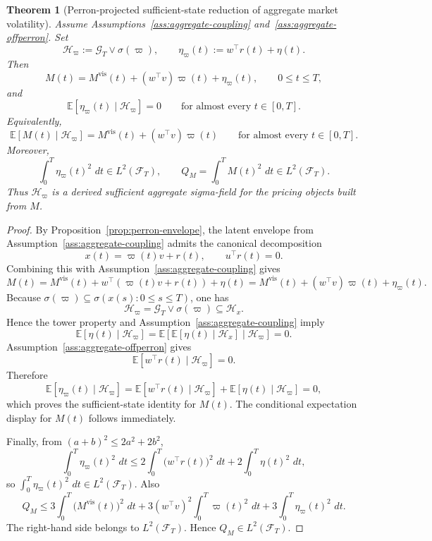 \documentclass[11pt,a4paper]{amsart}
\theoremstyle{plain}
\newtheorem{theorem}{Theorem}[section]
\theoremstyle{definition}
\theoremstyle{remark}
\newcommand{\EE}{\mathbb{E}}
\newcommand{\dd}{\,d}
\newcommand{\cH}{\mathcal{H}}
\newcommand{\cF}{\mathcal{F}}
\newcommand{\cG}{\mathcal{G}}
\begin{document}
\begin{theorem}[Perron-projected sufficient-state reduction of aggregate market volatility]\label{thm:sufficient-state-aggregate}
Assume Assumptions~\ref{ass:aggregate-coupling} and~\ref{ass:aggregate-offperron}.  Set
\[
        \cH_\varpi:=\cG_T\vee \sigma(\varpi),
        \qquad
        \eta_\varpi(t):=w^\top r(t)+\eta(t).
\]
Then
\[
        M(t)=M^{\mathrm{vis}}(t)+(w^\top v)\varpi(t)+\eta_\varpi(t),
        \qquad
        0\le t\le T,
\]
and
\[
        \EE[\eta_\varpi(t)\mid \cH_\varpi]=0
        \qquad
        \text{for almost every } t\in[0,T].
\]
Equivalently,
\[
        \EE[M(t)\mid \cH_\varpi]
        =
        M^{\mathrm{vis}}(t)+(w^\top v)\varpi(t)
        \qquad
        \text{for almost every } t\in[0,T].
\]
Moreover,
\[
        \int_0^T \eta_\varpi(t)^2\,\dd t\in L^2(\cF_T),
        \qquad
        Q_M=\int_0^T M(t)^2\,\dd t\in L^2(\cF_T).
\]
Thus \(\cH_\varpi\) is a derived sufficient aggregate sigma-field for the pricing objects built
from \(M\).
\end{theorem}

\begin{proof}
By Proposition~\ref{prop:perron-envelope}, the latent envelope from
Assumption~\ref{ass:aggregate-coupling} admits the canonical decomposition
\[
        x(t)=\varpi(t)v+r(t),
        \qquad
        u^\top r(t)=0.
\]
Combining this with Assumption~\ref{ass:aggregate-coupling} gives
\[
        M(t)
        =
        M^{\mathrm{vis}}(t)+w^\top(\varpi(t)v+r(t))+\eta(t)
        =
        M^{\mathrm{vis}}(t)+(w^\top v)\varpi(t)+\eta_\varpi(t).
\]
Because \(\sigma(\varpi)\subseteq \sigma(x(s):0\le s\le T)\), one has
\[
        \cH_\varpi=\cG_T\vee \sigma(\varpi)\subseteq \cH_x.
\]
Hence the tower property and Assumption~\ref{ass:aggregate-coupling} imply
\[
        \EE[\eta(t)\mid \cH_\varpi]
        =
        \EE\!\left[\EE[\eta(t)\mid \cH_x]\mid \cH_\varpi\right]
        =
        0.
\]
Assumption~\ref{ass:aggregate-offperron} gives
\[
        \EE[w^\top r(t)\mid \cH_\varpi]=0.
\]
Therefore
\[
        \EE[\eta_\varpi(t)\mid \cH_\varpi]
        =
        \EE[w^\top r(t)\mid \cH_\varpi]
        +
        \EE[\eta(t)\mid \cH_\varpi]
        =
        0,
\]
which proves the sufficient-state identity for \(M(t)\).  The conditional expectation display for
\(M(t)\) follows immediately.

Finally, from \((a+b)^2\le 2a^2+2b^2\),
\[
        \int_0^T \eta_\varpi(t)^2\,\dd t
        \le
        2\int_0^T \bigl(w^\top r(t)\bigr)^2\,\dd t
        +
        2\int_0^T \eta(t)^2\,\dd t,
\]
so \(\int_0^T \eta_\varpi(t)^2\,\dd t\in L^2(\cF_T)\).  Also
\[
        Q_M
        \le
        3\int_0^T \bigl(M^{\mathrm{vis}}(t)\bigr)^2\,\dd t
        +
        3(w^\top v)^2\int_0^T \varpi(t)^2\,\dd t
        +
        3\int_0^T \eta_\varpi(t)^2\,\dd t.
\]
The right-hand side belongs to \(L^2(\cF_T)\).  Hence \(Q_M\in L^2(\cF_T)\).
\end{proof}
\end{document}
